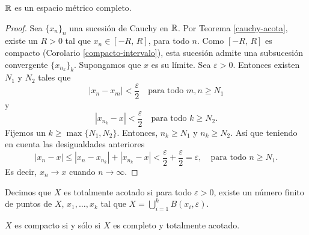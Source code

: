 \begin{teorema}\label{R-completo}
$\mathbb{R}$ es un espacio métrico completo.
\end{teorema}
\begin{proof}
Sea $\{x_n \}_n$ una sucesión de Cauchy en $\mathbb{R}$. Por Teorema \ref{cauchy-acota}, existe un $R>0$ tal que $x_n \in [-R, \, R]$, para todo $n$. Como $[-R, \, R]$ es compacto (Corolario \ref{compacto-intervalo}), esta sucesión admite una  subsucesión convergente $\{x_{n_k}\}_k$. Supongamos que $x$ es su límite. Sea $\varepsilon >0$. Entonces existen  $N_1$ y $N_2$ tales que
\[ | x_n- x_m|<\frac{\varepsilon}{2} \quad \text{para todo $m,n\geq N_1$}\]
y
\[ | x_{n_k}- x|<\frac{\varepsilon}{2} \quad \text{para todo $k\geq N_2$}.\]
Fijemos un $k\geq \max\{N_1, N_2\}$. Entonces, $n_k\geq N_1$ y $n_k\geq N_2$. Así que teniendo en cuenta las desigualdades anteriores
\[ | x_n- x | \leq | x_n- x_{n_k} |+| x_{n_k}- x | <\frac{\varepsilon}{2}+\frac{\varepsilon}{2}={\varepsilon}, \quad \text{para todo $n \geq N_1$}.\]
Es decir, $x_n \to x$ cuando $n\to \infty .$
\end{proof}

\begin{definicion}
Decimos que $X$ es totalmente acotado si para todo $\varepsilon >0$, existe un número finito de puntos de $X$, $x_1, \dots, x_k$ tal que $X=\bigcup _{i=1}^k B(x_i, \varepsilon).$
\end{definicion}

\begin{teorema}
$X$ es compacto si y sólo si $X$ es completo y totalmente acotado.
\end{teorema}
